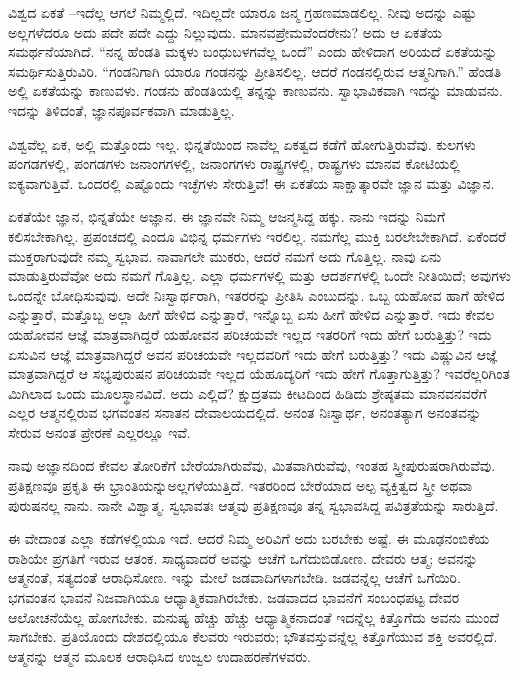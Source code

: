 \vskip -2pt

ವಿಶ್ವದ ಏಕತೆ –ಇದೆಲ್ಲ ಆಗಲೆ ನಿಮ್ಮಲ್ಲಿದೆ. ಇದಿಲ್ಲದೇ ಯಾರೂ ಜನ್ಮ ಗ್ರಹಣಮಾಡಲಿಲ್ಲ. ನೀವು ಅದನ್ನು ಎಷ್ಟು ಅಲ್ಲಗಳೆದರೂ ಅದು ಪದೇ ಪದೇ ಎದ್ದು ನಿಲ್ಲುವುದು. ಮಾನವಪ್ರೇಮವೆಂದರೇನು? ಅದು ಆ ಏಕತೆಯ ಸಮರ್ಥನೆಯಾಗಿದೆ. “ನನ್ನ ಹೆಂಡತಿ ಮಕ್ಕಳು ಬಂಧುಬಳಗವೆಲ್ಲ ಒಂದೆ'' ಎಂದು ಹೇಳಿದಾಗ ಅರಿಯದೆ ಏಕತೆಯನ್ನು ಸಮರ್ಥಿಸುತ್ತಿರುವಿರಿ. “ಗಂಡನಿಗಾಗಿ ಯಾರೂ ಗಂಡನನ್ನು ಪ್ರೀತಿಸಲಿಲ್ಲ. ಆದರೆ ಗಂಡನಲ್ಲಿರುವ ಆತ್ಮನಿಗಾಗಿ.” ಹೆಂಡತಿ ಅಲ್ಲಿ ಏಕತೆಯನ್ನು ಕಾಣುವಳು. ಗಂಡನು ಹೆಂಡತಿಯಲ್ಲಿ ತನ್ನನ್ನು ಕಾಣುವನು. ಸ್ವಾಭಾವಿಕವಾಗಿ ಇದನ್ನು ಮಾಡುವನು. ಇದನ್ನು ತಿಳಿದಂತೆ, ಜ್ಞಾನಪೂರ್ವಕವಾಗಿ ಮಾಡುತ್ತಿಲ್ಲ.

ವಿಶ್ವವೆಲ್ಲ ಏಕ, ಅಲ್ಲಿ ಮತ್ತೊಂದು ಇಲ್ಲ. ಭಿನ್ನತೆಯಿಂದ ನಾವೆಲ್ಲ ಏಕತ್ವದ ಕಡೆಗೆ ಹೋಗುತ್ತಿರುವೆವು. ಕುಲಗಳು ಪಂಗಡಗಳಲ್ಲಿ, ಪಂಗಡಗಳು ಜನಾಂಗಗಳಲ್ಲಿ, ಜನಾಂಗಗಳು ರಾಷ್ಟ್ರಗಳಲ್ಲಿ, ರಾಷ್ಟ್ರಗಳು ಮಾನವ ಕೋಟಿಯಲ್ಲಿ ಐಕ್ಯವಾಗುತ್ತಿವೆ. ಒಂದರಲ್ಲಿ ಎಷ್ಟೊಂದು ಇಚ್ಛೆಗಳು ಸೇರುತ್ತಿವೆ! ಈ ಏಕತೆಯ ಸಾಕ್ಷಾತ್ಕಾರವೇ ಜ್ಞಾನ ಮತ್ತು ವಿಜ್ಞಾನ.

ಏಕತೆಯೇ ಜ್ಞಾನ, ಭಿನ್ನತೆಯೇ ಅಜ್ಞಾನ. ಈ ಜ್ಞಾನವೇ ನಿಮ್ಮ ಆಜನ್ಮಸಿದ್ದ ಹಕ್ಕು. ನಾನು ಇದನ್ನು ನಿಮಗೆ ಕಲಿಸಬೇಕಾಗಿಲ್ಲ. ಪ್ರಪಂಚದಲ್ಲಿ ಎಂದೂ ವಿಭಿನ್ನ ಧರ್ಮಗಳು ಇರಲಿಲ್ಲ. ನಮಗೆಲ್ಲ ಮುಕ್ತಿ ಬರಲೇಬೇಕಾಗಿದೆ. ಏಕೆಂದರೆ ಮುಕ್ತರಾಗುವುದೇ ನಮ್ಮ ಸ್ವಭಾವ. ನಾವಾಗಲೇ ಮುಕರು, ಆದರೆ ನಮಗೆ ಅದು ಗೊತ್ತಿಲ್ಲ. ನಾವು ಏನು ಮಾಡುತ್ತಿರುವೆವೋ ಅದು ನಮಗೆ ಗೊತ್ತಿಲ್ಲ. ಎಲ್ಲಾ ಧರ್ಮಗಳಲ್ಲಿ ಮತ್ತು ಆದರ್ಶಗಳಲ್ಲಿ ಒಂದೇ ನೀತಿಯಿದೆ; ಅವುಗಳು ಒಂದನ್ನೇ ಬೋಧಿಸುವುವು. ಅದೇ ನಿಃಸ್ವಾರ್ಥರಾಗಿ, ಇತರರನ್ನು ಪ್ರೀತಿಸಿ ಎಂಬುದನ್ನು. ಒಬ್ಬ ಯಹೋವ ಹಾಗೆ ಹೇಳಿದ ಎನ್ನುತ್ತಾರೆ, ಮತ್ತೊಬ್ಬ ಅಲ್ಲಾ ಹೀಗೆ ಹೇಳಿದ ಎನ್ನುತ್ತಾರೆ, ಇನ್ನೊಬ್ಬ ಏಸು ಹೀಗೆ ಹೇಳಿದ ಎನ್ನುತ್ತಾರೆ. ಇದು ಕೇವಲ ಯಹೋವನ ಆಜ್ಞೆ ಮಾತ್ರವಾಗಿದ್ದರೆ ಯಹೋವನ ಪರಿಚಯವೇ ಇಲ್ಲದ ಇತರರಿಗೆ ಇದು ಹೇಗೆ ಬರುತ್ತಿತ್ತು? ಇದು ಏಸುವಿನ ಆಜ್ಞೆ ಮಾತ್ರವಾಗಿದ್ದರೆ ಅವನ ಪರಿಚಯವೇ ಇಲ್ಲದವರಿಗೆ ಇದು ಹೇಗೆ ಬರುತ್ತಿತ್ತು? ಇದು ವಿಷ್ಣುವಿನ ಆಜ್ಞೆ ಮಾತ್ರವಾಗಿದ್ದರೆ ಆ ಸಭ್ಯಪುರುಷನ ಪರಿಚಯವೇ ಇಲ್ಲದ ಯೆಹೂದ್ಯರಿಗೆ ಇದು ಹೇಗೆ ಗೊತ್ತಾಗುತ್ತಿತ್ತು? ಇವರೆಲ್ಲರಿಗಿಂತ ಮಿಗಿಲಾದ ಒಂದು ಮೂಲಸ್ಥಾನವಿದೆ. ಅದು ಎಲ್ಲಿದೆ? ಕ್ಷುದ್ರತಮ ಕೀಟದಿಂದ ಹಿಡಿದು ಶ್ರೇಷ್ಠತಮ ಮಾನವನವರೆಗೆ ಎಲ್ಲರ ಆತ್ಮನಲ್ಲಿರುವ ಭಗವಂತನ ಸನಾತನ ದೇವಾಲಯದಲ್ಲಿದೆ. ಅನಂತ ನಿಃಸ್ವಾರ್ಥ, ಅನಂತತ್ಯಾಗ ಅನಂತವನ್ನು ಸೇರುವ ಅನಂತ ಪ್ರೇರಣೆ ಎಲ್ಲರಲ್ಲೂ ಇವೆ.

\vskip -1pt

ನಾವು ಅಜ್ಞಾನದಿಂದ ಕೇವಲ ತೋರಿಕೆಗೆ ಬೇರೆಯಾಗಿರುವೆವು, ಮಿತವಾಗಿರುವೆವು, ಇಂತಹ ಸ್ತ್ರೀಪುರುಷರಾಗಿರುವೆವು. ಪ್ರತಿಕ್ಷಣವೂ ಪ್ರಕೃತಿ ಈ ಭ್ರಾಂತಿಯನ್ನು\break ಅಲ್ಲಗಳೆಯುತ್ತಿದೆ. ಇತರರಿಂದ ಬೇರೆಯಾದ ಅಲ್ಪ ವ್ಯಕ್ತಿತ್ವದ ಸ್ತ್ರೀ ಅಥವಾ ಪುರುಷನಲ್ಲ ನಾನು. ನಾನೇ ವಿಶ್ವಾತ್ಮ. ಸ್ವಭಾವತಃ ಆತ್ಮವು ಪ್ರತಿಕ್ಷಣವೂ ತನ್ನ ಸ್ವಭಾವಸಿದ್ದ ಪವಿತ್ರತೆಯನ್ನು ಸಾರುತ್ತಿದೆ.

ಈ ವೇದಾಂತ ಎಲ್ಲಾ ಕಡೆಗಳಲ್ಲಿಯೂ ಇದೆ. ಆದರೆ ನಿಮ್ಮ ಅರಿವಿಗೆ ಅದು ಬರಬೇಕು ಅಷ್ಟೆ. ಈ ಮೂಢನಂಬಿಕೆಯ ರಾಶಿಯೇ ಪ್ರಗತಿಗೆ ಇರುವ ಆತಂಕ. ಸಾಧ್ಯವಾದರೆ ಅವನ್ನು ಆಚೆಗೆ ಒಗೆದುಬಿಡೋಣ. ದೇವರು ಆತ್ಮ; ಅವನನ್ನು ಆತ್ಮನಂತೆ, ಸತ್ಯದಂತೆ ಆರಾಧಿಸೋಣ. ಇನ್ನು ಮೇಲೆ ಜಡವಾದಿಗಳಾಗಬೇಡಿ. ಜಡವನ್ನೆಲ್ಲ ಆಚೆಗೆ ಒಗೆಯಿರಿ. ಭಗವಂತನ ಭಾವನೆ ನಿಜವಾಗಿಯೂ ಆಧ್ಯಾತ್ಮಿಕವಾಗಿರಬೇಕು. ಜಡವಾದದ ಭಾವನೆಗೆ ಸಂಬಂಧಪಟ್ಟ ದೇವರ ಆಲೋಚನೆಯೆಲ್ಲ ಹೋಗಬೇಕು. ಮನುಷ್ಯ ಹೆಚ್ಚು ಹೆಚ್ಚು ಆಧ್ಯಾತ್ಮಿಕನಾದಂತೆ ಇದನ್ನೆಲ್ಲ ಕಿತ್ತೊಗೆದು ಅವನು ಮುಂದೆ ಸಾಗಬೇಕು. ಪ್ರತಿಯೊಂದು ದೇಶದಲ್ಲಿಯೂ ಕೆಲವರು ಇರುವರು; ಭೌತವಸ್ತುವನ್ನೆಲ್ಲ ಕಿತ್ತೊಗೆಯುವ ಶಕ್ತಿ ಅವರಲ್ಲಿದೆ. ಆತ್ಮನನ್ನು ಆತ್ಮನ ಮೂಲಕ ಆರಾಧಿಸಿದ ಉಜ್ವಲ ಉದಾಹರಣೆಗಳವರು.

